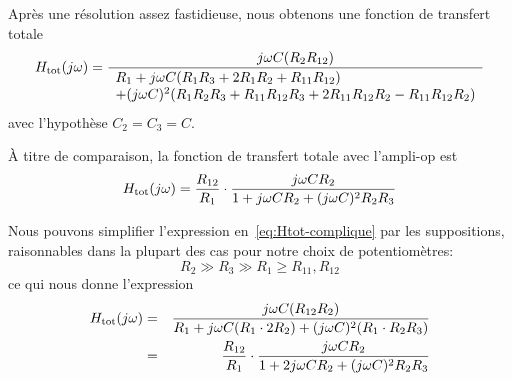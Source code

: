 Après une résolution assez fastidieuse, nous obtenons une fonction de transfert
totale
\begin{equation} \label{eq:Htot-complique}
    H_{\mathrm{tot}}(j\omega) = \frac{j\omega C(R_2R_{12})}
    {\begin{array}{l}
            R_1 + j\omega C(R_1R_3+2R_1R_2+R_{11}R_{12})\\
        + (j\omega C)^2(R_1R_2R_3 + R_{11}R_{12}R_3 + 2R_{11}R_{12}R_2
        - R_{11}R_{12}R_2)
\end{array}}
\end{equation}
avec l'hypothèse $C_2 = C_3 = C$.

À titre de comparaison, la fonction de transfert totale avec l'ampli-op est
\begin{equation}
    H_{\mathrm{tot}}(j\omega) = \frac{R_{12}}{R_1}\cdot
    \frac{j\omega CR_2}
    {1+j\omega CR_2 + (j\omega C)^2R_2R_3}
\end{equation}

Nous pouvons simplifier l'expression en~\eqref{eq:Htot-complique}
par les suppositions, raisonnables dans la plupart des cas
pour notre choix de potentiomètres:
\begin{equation}
    R_2 \gg R_3 \gg R_1 \geq R_{11},R_{12}
\end{equation}
ce qui nous donne l'expression
\begin{equation}
    \begin{aligned}
        H_{\mathrm{tot}}(j\omega) &=& \frac{j\omega C (R_{12} R_2)}
        {R_1 + j\omega C(R_1\cdot 2R_2) + (j\omega C)^2(R_1\cdot R_2R_3)} \\
        &=& \frac{R_{12}}{R_1}\cdot
        \frac{j\omega C R_2}{1+2j\omega CR_2 + (j\omega C)^2R_2R_3}
    \end{aligned}
\end{equation}
